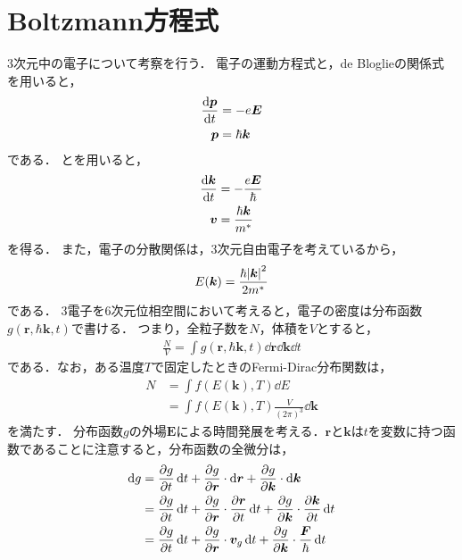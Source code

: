 \documentclass{report}
\begin{document}
    \section{Boltzmann方程式}
      3次元中の電子について考察を行う．
      電子の運動方程式と，de Bloglieの関係式を用いると，
      \begin{align}
        \dv{\bm{p}}{t} &= -e\bm{E} \label{newton-eq} \\
        \bm{p} &= \hbar\bm{k} \label{de-broglie}
      \end{align}
      である．
      とを用いると，
      \begin{align}
        \dv{\bm{k}}{t} &= -\frac{e\bm{E}}{\hbar} \label{de-broglie-newton} \\ 
        \bm{v} &= \frac{\hbar\bm{k}}{m^*}
      \end{align}
      を得る．
      また，電子の分散関係は，3次元自由電子を考えているから，
      \begin{align}
        E(\bm{k}) = \frac{\hbar \abs{\bm{k}}^2}{2m^*} \label{dispersion-relation}
      \end{align}
      である．
      3電子を$6$次元位相空間において考えると，電子の密度は分布函数$g(\bm{r}, \hbar\bm{k}, t)$で書ける．
      つまり，全粒子数を$N$，体積を$V$とすると，
      \begin{align}
        \frac{N}{V} = \int g(\bm{r}, \hbar\bm{k}, t)\dd{\bm{r}}\dd{\bm{k}}\dd{t} \label{density}
      \end{align}
      である．なお，ある温度$T$で固定したときのFermi-Dirac分布関数は，
      \begin{align}
        N &= \int f(E(\bm{k}), T)\dd{E} \\
        &= \int f(E(\bm{k}),T) \frac{V}{(2\pi)^3} \dd{\bm{k}} \label{fermi-dirac}
      \end{align}
      を満たす．
      分布函数$g$の外場$\bm{E}$による時間発展を考える．$\bm{r}$と$\bm{k}$は$t$を変数に持つ函数であることに注意すると，分布函数の全微分は，
      \begin{align}
        \dd{g} &= \pdv{g}{t}\dd{t} + \pdv{g}{\bm{r}}\cdot \dd{\bm{r}} + \pdv{g}{\bm{k}}\cdot \dd{\bm{k}} \label{boltzmann-total-diff} \\ 
        &= \pdv{g}{t}\dd{t} + \pdv{g}{\bm{r}}\cdot \pdv{\bm{r}}{t}\dd{t} + \pdv{g}{\bm{k}}\cdot \pdv{\bm{k}}{t}\dd{t} \\ 
        &= \pdv{g}{t}\dd{t} + \pdv{g}{\bm{r}}\cdot \bm{v}_{g}\dd{t} + \pdv{g}{\bm{k}}\cdot \frac{\bm{F}}{\hbar}\dd{t} 
      \end{align}
\end{document}
